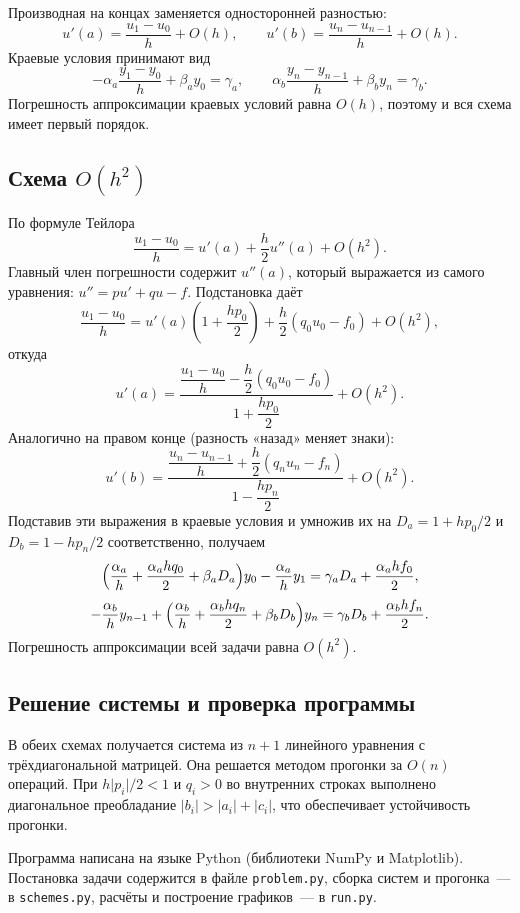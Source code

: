 \documentclass[12pt,a4paper]{article}
\begin{document}
Производная на концах заменяется односторонней разностью:
\[
u'(a) = \frac{u_1-u_0}{h} + O(h),\qquad
u'(b) = \frac{u_n-u_{n-1}}{h} + O(h).
\]
Краевые условия принимают вид
\[
-\alpha_a\frac{y_1-y_0}{h} + \beta_a y_0 = \gamma_a,\qquad
\alpha_b\frac{y_n-y_{n-1}}{h} + \beta_b y_n = \gamma_b .
\]
Погрешность аппроксимации краевых условий равна $O(h)$, поэтому и вся
схема имеет первый порядок.

\subsection{Схема $O(h^2)$}

По формуле Тейлора
\[
\frac{u_1-u_0}{h} = u'(a) + \frac{h}{2}u''(a) + O(h^2).
\]
Главный член погрешности содержит $u''(a)$, который выражается из
самого уравнения: $u'' = pu' + qu - f$. Подстановка даёт
\[
\frac{u_1-u_0}{h} = u'(a)\left(1+\frac{hp_0}{2}\right)
+ \frac{h}{2}(q_0u_0 - f_0) + O(h^2),
\]
откуда
\[
u'(a) = \frac{\dfrac{u_1-u_0}{h} - \dfrac{h}{2}(q_0u_0-f_0)}
{1+\dfrac{hp_0}{2}} + O(h^2).
\]
Аналогично на правом конце (разность «назад» меняет знаки):
\[
u'(b) = \frac{\dfrac{u_n-u_{n-1}}{h} + \dfrac{h}{2}(q_nu_n-f_n)}
{1-\dfrac{hp_n}{2}} + O(h^2).
\]
Подставив эти выражения в краевые условия и умножив их на
$D_a = 1+hp_0/2$ и $D_b = 1-hp_n/2$ соответственно, получаем
\[
\Bigl(\frac{\alpha_a}{h} + \frac{\alpha_a h q_0}{2} + \beta_a D_a\Bigr)y_0
- \frac{\alpha_a}{h}y_1 = \gamma_a D_a + \frac{\alpha_a h f_0}{2},
\]
\[
-\frac{\alpha_b}{h}y_{n-1}
+ \Bigl(\frac{\alpha_b}{h} + \frac{\alpha_b h q_n}{2} + \beta_b D_b\Bigr)y_n
= \gamma_b D_b + \frac{\alpha_b h f_n}{2}.
\]
Погрешность аппроксимации всей задачи равна $O(h^2)$.

\subsection{Решение системы и проверка программы}

В обеих схемах получается система из $n+1$ линейного уравнения с
трёхдиагональной матрицей. Она решается методом прогонки за $O(n)$
операций. При $h\lvert p_i\rvert/2 < 1$ и $q_i>0$ во внутренних строках
выполнено диагональное преобладание $\lvert b_i\rvert > \lvert a_i\rvert
+ \lvert c_i\rvert$, что обеспечивает устойчивость прогонки.

Программа написана на языке Python (библиотеки NumPy и Matplotlib).
Постановка задачи содержится в файле \texttt{problem.py}, сборка систем
и прогонка~--- в \texttt{schemes.py}, расчёты и построение графиков~---
в \texttt{run.py}.
\end{document}
